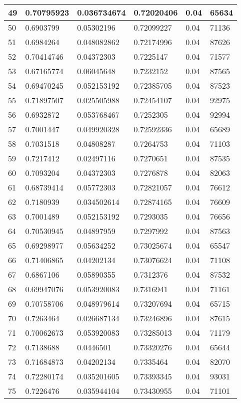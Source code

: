 \begin{longtable}{|l|l|l|l|l|l|}
49 & 0.70795923 & 0.036734674 & 0.72020406 & 0.04 & 65634 \\ \hline 
50 & 0.6903799 & 0.05302196 & 0.72099227 & 0.04 & 71136 \\ \hline 
51 & 0.6984264 & 0.048082862 & 0.72174996 & 0.04 & 87626 \\ \hline 
52 & 0.70414746 & 0.04372303 & 0.7225147 & 0.04 & 71577 \\ \hline 
53 & 0.67165774 & 0.06045648 & 0.7232152 & 0.04 & 87565 \\ \hline 
54 & 0.69470245 & 0.052153192 & 0.72385705 & 0.04 & 87523 \\ \hline 
55 & 0.71897507 & 0.025505988 & 0.72454107 & 0.04 & 92975 \\ \hline 
56 & 0.6932872 & 0.053768467 & 0.7252305 & 0.04 & 92994 \\ \hline 
57 & 0.7001447 & 0.049920328 & 0.72592336 & 0.04 & 65689 \\ \hline 
58 & 0.7031518 & 0.04808287 & 0.7264753 & 0.04 & 71103 \\ \hline 
59 & 0.7217412 & 0.02497116 & 0.7270651 & 0.04 & 87535 \\ \hline 
60 & 0.7093204 & 0.04372303 & 0.7276878 & 0.04 & 82063 \\ \hline 
61 & 0.68739414 & 0.05772303 & 0.72821057 & 0.04 & 76612 \\ \hline 
62 & 0.7180939 & 0.034502614 & 0.72874165 & 0.04 & 76609 \\ \hline 
63 & 0.7001489 & 0.052153192 & 0.7293035 & 0.04 & 76656 \\ \hline 
64 & 0.70530945 & 0.04897959 & 0.7297992 & 0.04 & 87563 \\ \hline 
65 & 0.69298977 & 0.05634252 & 0.73025674 & 0.04 & 65547 \\ \hline 
66 & 0.71406865 & 0.04202134 & 0.73076624 & 0.04 & 71108 \\ \hline 
67 & 0.6867106 & 0.05890355 & 0.7312376 & 0.04 & 87532 \\ \hline 
68 & 0.69947076 & 0.053920083 & 0.7316941 & 0.04 & 71161 \\ \hline 
69 & 0.70758706 & 0.048979614 & 0.73207694 & 0.04 & 65715 \\ \hline 
70 & 0.7263464 & 0.026687134 & 0.73246896 & 0.04 & 87615 \\ \hline 
71 & 0.70062673 & 0.053920083 & 0.73285013 & 0.04 & 71179 \\ \hline 
72 & 0.7138688 & 0.0446501 & 0.73320276 & 0.04 & 65644 \\ \hline 
73 & 0.71684873 & 0.04202134 & 0.7335464 & 0.04 & 82070 \\ \hline 
74 & 0.72280174 & 0.035201605 & 0.73393345 & 0.04 & 93031 \\ \hline 
75 & 0.7226476 & 0.035944104 & 0.73430955 & 0.04 & 71101 \\ \hline 
\end{longtable}